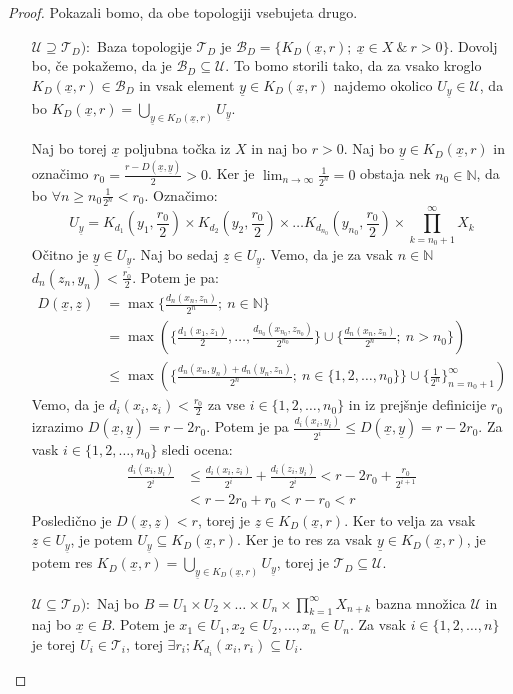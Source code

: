 \documentclass[a4paper, 10pt]{article}
\newcommand{\ul}[1]{\underline{\ensuremath{#1}}}
\newcommand{\mth}[1]{\ensuremath{\mathbb{#1}}}
\newcommand{\N}{\mth{N}}
\newcommand{\set}[1]{\ensuremath{\{1, 2, \ldots , #1\}}}
\begin{document}
	\begin{proof}
		Pokazali bomo, da obe topologiji vsebujeta drugo. \begin{itemize}
			\item[$\mathcal{U} \supseteq \mathcal{T}_D):$] Baza topologije $\mathcal{T}_D$ je $\mathcal{B}_D = \{K_D(\ul{x}, r);~ \ul{x}\in X ~\&~ r>0\}$. Dovolj bo, če pokažemo, da je $\mathcal{B}_D \subseteq \mathcal{U}$. To bomo storili tako, da za vsako kroglo $K_D(\ul{x}, r)\in \mathcal{B}_D$ in vsak element $\ul{y}\in K_D(\ul{x}, r)$ najdemo okolico $U_{\ul{y}}\in \mathcal{U}$, da bo $K_D(\ul{x}, r) = \bigcup_{\ul{y}\in K_D(\ul{x}, r)}U_{\ul{y}}$.
			
			Naj bo torej $\ul{x}$ poljubna točka iz $X$ in naj bo $r>0$. Naj bo $\ul{y}\in K_D(\ul{x}, r)$ in označimo $r_0 = \frac{r - D(\ul{x}, \ul{y})}{2} > 0$. Ker je $\lim_{n\to\infty}\frac{1}{2^n} = 0$ obstaja nek $n_0\in\N$, da bo $\forall n\geq n_0 \frac{1}{2^n} < r_0$. Označimo: $$U_{\ul{y}} = K_{d_1}(y_1, \frac{r_0}{2})\times K_{d_2}(y_2, \frac{r_0}{2})\times\ldots K_{d_{n_0}}(y_{n_0}, \frac{r_0}{2})\times\prod_{k = n_0 + 1}^\infty X_k$$
			Očitno je $\ul{y}\in U_{\ul{y}}$. Naj bo sedaj $\ul{z}\in U_{\ul{y}}$. Vemo, da je za vsak $n\in\N$ $d_n(z_n, y_n) < \frac{r_0}{2}$. Potem je pa: \begin{align*}
				D(\ul{x}, \ul{z}) &= \max\{\frac{d_n(x_n, z_n)}{2^n};~n\in\N\} \\
				&= \max\left(\{\frac{d_1(x_1, z_1)}{2}, \ldots, \frac{d_{n_0}(x_{n_0}, z_{n_0})}{2^{n_0}}\}\cup\{\frac{d_n(x_n, z_n)}{2^n};~n> n_0\}\right) \\
				&\leq \max\left(\{\frac{d_n(x_n, y_n) + d_n(y_n, z_n)}{2^n};~n\in \set{n_0}\}\cup\{\frac{1}{2^n}\}^{\infty}_{n = n_0 + 1}\right)
			\end{align*}
			Vemo, da je $d_i(x_i, z_i) < \frac{r_0}{2}$ za vse $i\in \set{n_0}$ in iz prejšnje definicije $r_0$ izrazimo $D(\ul{x}, \ul{y}) = r - 2r_0$. Potem je pa $\frac{d_i(x_i, y_i)}{2^i} \leq D(\ul{x}, \ul{y})= r - 2r_0$. Za vask $i\in \set{n_0}$ sledi ocena: \begin{align*}
				\frac{d_i(x_i, y_i)}{2^i} &\leq \frac{d_i(x_i, z_i)}{2^i} + \frac{d_i(z_i, y_i)}{2^i} < r - 2r_0 + \frac{r_0}{2^{i+1}} \\ &< r - 2r_0 + r_0 < r- r_0 < r
			\end{align*}
			Posledično je $D(\ul{x}, \ul{z}) < r$, torej je $\ul{z}\in K_D(\ul{x}, r)$. Ker to velja za vsak $\ul{z} \in U_{\ul{y}}$, je potem $U_{\ul{y}} \subseteq K_D(\ul{x}, r)$. Ker je to res za vsak $\ul{y}\in K_D(\ul{x}, r)$, je potem res $K_D(\ul{x}, r)=\bigcup_{\ul{y}\in K_D(\ul{x}, r)}U_{\ul{y}}$, torej je $\mathcal{T}_D \subseteq \mathcal{U}$.
			\item[$\mathcal{U} \subseteq \mathcal{T}_D):$] Naj bo $B = U_1\times U_2\times\ldots\times U_n \times \prod_{k = 1}^\infty X_{n+k}$ bazna množica $\mathcal{U}$ in naj bo $\ul{x}\in B$. Potem je $x_1\in U_1, x_2\in U_2,\ldots, x_n\in U_n$. Za vsak $i\in\set{n}$ je torej $U_i\in \mathcal{T}_i$, torej $\exists r_i; K_{d_i}(x_i, r_i)\subseteq U_i$. 
			

\end{itemize}
\end{proof}
\end{document}
